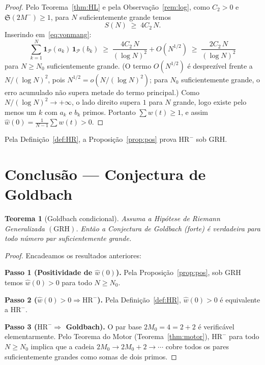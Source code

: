 \documentclass[12pt,a4paper]{article}
\newtheorem{theorem}{Teorema}[section]
\theoremstyle{definition}
\newcommand{\PP}{\mathcal{P}}          %
\newcommand{\HRm}{\mathrm{HR}^{-}}
\newcommand{\GRH}{\mathrm{GRH}}
\newcommand{\Ss}{\mathfrak{S}}         %
\newcommand{\1}[1]{\mathbf{1}_{#1}}
\begin{document}
	\begin{proof}
		Pelo Teorema~\ref{thm:HL} e pela Observação~\ref{rem:log}, como
		$C_2 > 0$ e $\Ss(2M^-) \geq 1$, para $N$ suficientemente grande temos
		\[
		S(N) \;\geq\; 4C_2\,N.
		\]
		Inserindo em~\eqref{eq:vonmang}:
		\[
		\sum_{k=1}^{N} \1{\PP}(a_k)\,\1{\PP}(b_k)
		\;\geq\;
		\frac{4C_2\,N}{(\log N)^2} + O(N^{1/2})
		\;\geq\;
		\frac{2C_2\,N}{(\log N)^2}
		\]
		para $N \geq N_0$ suficientemente grande. (O termo $O(N^{1/2})$ é
		desprezível frente a $N/(\log N)^2$, pois
		$N^{1/2} = o\!\left(N/(\log N)^2\right)$;
		para $N_0$ suficientemente grande, o erro acumulado não supera metade
		do termo principal.) Como $N/(\log N)^2 \to +\infty$,
		o lado direito supera $1$ para $N$ grande, logo existe pelo menos um $k$
		com $a_k$ e $b_k$ primos. Portanto $\sum w(t) \geq 1$, e assim
		$\widehat{w}(0) = \frac{1}{N-1}\sum w(t) > 0$.
	\end{proof}
	
	Pela Definição~\ref{def:HR}, a Proposição~\ref{prop:pos} prova $\HRm$
	sob $\GRH$.
	
	\section{Conclusão --- Conjectura de Goldbach}
	\label{sec:concl}
	
	\begin{theorem}[Goldbach condicional]
		\label{thm:main}
		Assuma a Hipótese de Riemann Generalizada $(\GRH)$. Então a Conjectura
		de Goldbach (forte) é verdadeira para todo número par suficientemente
		grande.
	\end{theorem}
	
	\begin{proof}
		Encadeamos os resultados anteriores:
		
		\medskip
		\noindent\textbf{Passo 1 (Positividade de $\widehat{w}(0)$).}
		Pela Proposição~\ref{prop:pos}, sob $\GRH$ temos $\widehat{w}(0) > 0$
		para todo $N \geq N_0$.
		
		\medskip
		\noindent\textbf{Passo 2 ($\widehat{w}(0) > 0 \Rightarrow \HRm$).}
		Pela Definição~\ref{def:HR}, $\widehat{w}(0) > 0$ é equivalente a $\HRm$.
		
		\medskip
		\noindent\textbf{Passo 3 ($\HRm \Rightarrow$ Goldbach).}
		O par base $2M_0 = 4 = 2+2$ é verificável elementarmente.
		Pelo Teorema do Motor (Teorema~\ref{thm:motor}), $\HRm$ para todo
		$N \geq N_0$ implica que a cadeia $2M_0 \to 2M_0+2 \to \cdots$
		cobre todos os pares suficientemente grandes como somas de dois primos.
	\end{proof}
	
\end{document}
